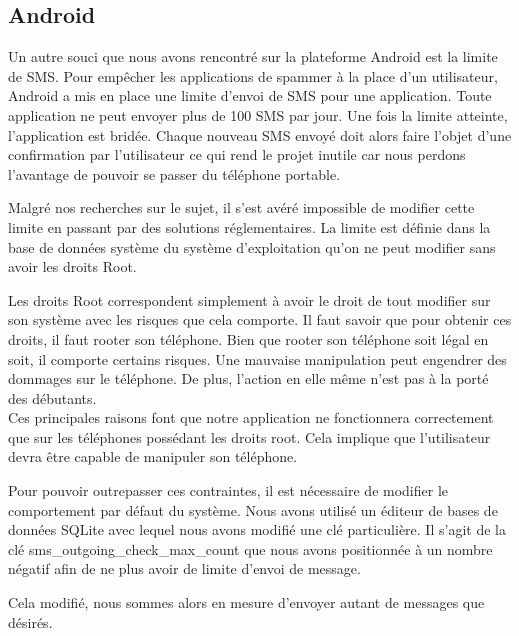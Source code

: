 \subsection{Android}


Un autre souci que nous avons rencontré sur la plateforme Android est la limite de SMS. Pour empêcher
les applications de spammer à la place d'un utilisateur, Android a mis en place une limite d'envoi de 
SMS pour une application. Toute application ne peut envoyer plus de 100 SMS par jour. Une fois la limite
atteinte, l'application est bridée. Chaque nouveau SMS envoyé doit alors faire l'objet d'une confirmation
par l'utilisateur ce qui rend le projet inutile car nous perdons l'avantage de pouvoir se passer du 
téléphone portable.

Malgré nos recherches sur le sujet, il s'est avéré impossible de modifier cette limite en passant par
des solutions réglementaires. La limite est définie dans la base de données système du système d'exploitation
qu'on ne peut modifier sans avoir les droits Root.

Les droits Root correspondent simplement à avoir le droit de tout modifier sur son système avec les 
risques que cela comporte. Il faut savoir que pour obtenir ces droits, il faut rooter son téléphone.
Bien que rooter son téléphone soit légal en soit, il comporte certains risques. Une mauvaise manipulation
peut engendrer des dommages sur le téléphone. De plus, l'action en elle même n'est pas à la porté des 
débutants.
\\


Ces principales raisons font que notre application ne fonctionnera correctement que sur les téléphones
possédant les droits root. Cela implique que l'utilisateur devra être capable de manipuler son téléphone.

Pour pouvoir outrepasser ces contraintes, il est nécessaire de modifier le comportement par défaut du 
système. Nous avons utilisé un éditeur de bases de données SQLite avec lequel nous avons modifié une clé 
particulière. Il s'agit de la clé sms\_outgoing\_check\_max\_count que nous avons positionnée à un nombre négatif afin de ne plus avoir de limite d'envoi de message.

Cela modifié, nous sommes alors en mesure d'envoyer autant de messages que désirés. 




